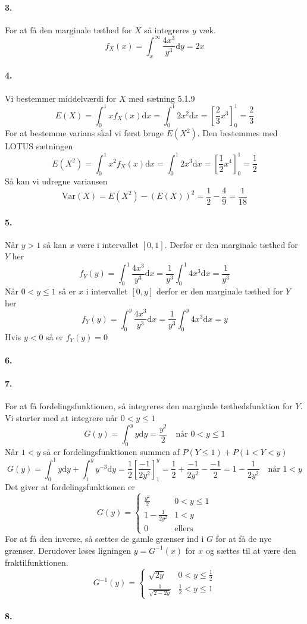 \documentclass[12pt]{article}
\begin{document}
\paragraph{3.}
For at få den marginale tæthed for $X$ så integreres $y$ væk.
\[
    f_X(x)=\int_x^\infty \frac{4x^3}{y^3} \mathrm{d}y = 2x
\]
\paragraph{4.}
Vi bestemmer middelværdi for $X$ med sætning 5.1.9
\[
    E(X) = \int_0^1 xf_X(x)\mathrm{d}x = \int_0^1 2x^2 \mathrm{d}x = \left[ \frac{2}{3}x^3 \right]_0^1 = \frac{2}{3}
\]
For at bestemme varians skal vi først bruge $E(X^2)$. Den bestemmes med LOTUS sætningen
\[
    E(X^2) = \int_0^1 x^2 f_X(x)\mathrm{d}x = \int_0^1 2x^3 \mathrm{d}x = \left[ \frac{1}{2}x^4 \right]_0^1 = \frac{1}{2}
\]
Så kan vi udregne variansen
\[
    \mathrm{Var}(X) = E(X^2) - (E(X))^2 = \frac{1}{2} - \frac{4}{9} = \frac{1}{18}
\]

\paragraph{5.}
Når $y > 1$ så kan $x$ være i intervallet $[0,1]$. Derfor er den marginale tæthed for $Y$ her
\[
    f_Y(y) = \int_0^1 \frac{4x^3}{y^3} \mathrm{d}x = \frac{1}{y^3} \int_0^1 4x^3 \mathrm{d}x = \frac{1}{y^3}
\]
Når $0 < y \leq 1$ så er $x$ i intervallet $[0, y]$ derfor er den marginale tæthed for $Y$ her
\[
    f_Y(y) = \int_0^y \frac{4x^3}{y^3} \mathrm{d}x = \frac{1}{y^3} \int_0^y 4x^3 \mathrm{d}x = y
\]
Hvis $y < 0$ så er $f_Y(y) = 0$
\paragraph{6.}
\paragraph{7.}
For at få fordelingsfunktionen, så integreres den marginale tæthedsfunktion for $Y$. 
Vi starter med at integrere når $0 < y \leq 1$
\[
    G(y) =
    \int_0^y y \mathrm{d}y = \frac{y^2}{2} \quad \text{når } 0 < y \leq 1
\]
Når $1 < y$ så er fordelingsfunktionen summen af $P(Y \leq 1) + P(1 < Y < y)$
\[
    G(y) =
    \int_0^1 y \mathrm{d}y + \int_1^y y^{-3} \mathrm{d}y = \frac{1}{2}\left[ \frac{-1}{2y^2} \right]_1^y = \frac{1}{2} + \frac{-1}{2y^2} - \frac{-1}{2} = 1-\frac{1}{2y^2}
    \quad \text{når } 1 < y
\]
Det giver at fordelingsfunktionen er
\[
    G(y) =
    \begin{cases}
        \frac{y^2}{2} & 0<y\leq 1\\
        1-\frac{1}{2y^2} & 1 < y \\
        0 &\text{ellers}
    \end{cases}
\]
For at få den inverse, så sættes de gamle grænser ind i $G$ for at få de nye grænser. Derudover løses ligningen $y = G^{-1}(x)$ for $x$ og sættes til at være den fraktilfunktionen.
\[
    G^{-1}(y) =
    \begin{cases}
        \sqrt{2y} & 0 < y \leq \frac{1}{2} \\
        \frac{1}{\sqrt{2-2y}} & \frac{1}{2} < y \leq 1
    \end{cases}
\]
\paragraph{8.}
\end{document}
